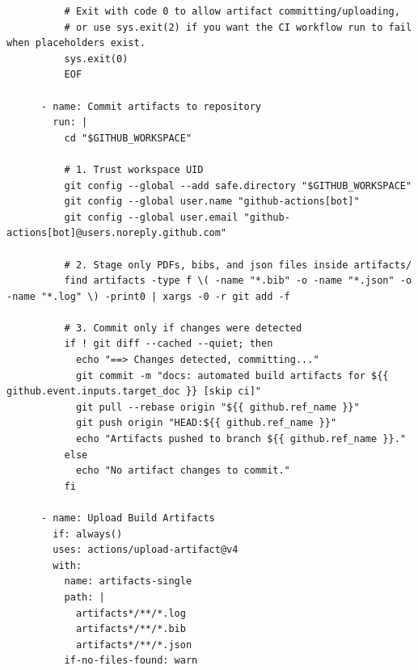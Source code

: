 \documentclass[12pt, twoside]{article}
\begin{document}
\begin{lstlisting}
          # Exit with code 0 to allow artifact committing/uploading,
          # or use sys.exit(2) if you want the CI workflow run to fail when placeholders exist.
          sys.exit(0)
          EOF

      - name: Commit artifacts to repository
        run: |
          cd "$GITHUB_WORKSPACE"

          # 1. Trust workspace UID
          git config --global --add safe.directory "$GITHUB_WORKSPACE"
          git config --global user.name "github-actions[bot]"
          git config --global user.email "github-actions[bot]@users.noreply.github.com"

          # 2. Stage only PDFs, bibs, and json files inside artifacts/
          find artifacts -type f \( -name "*.bib" -o -name "*.json" -o -name "*.log" \) -print0 | xargs -0 -r git add -f

          # 3. Commit only if changes were detected
          if ! git diff --cached --quiet; then
            echo "==> Changes detected, committing..."
            git commit -m "docs: automated build artifacts for ${{ github.event.inputs.target_doc }} [skip ci]"
            git pull --rebase origin "${{ github.ref_name }}"
            git push origin "HEAD:${{ github.ref_name }}"
            echo "Artifacts pushed to branch ${{ github.ref_name }}."
          else
            echo "No artifact changes to commit."
          fi

      - name: Upload Build Artifacts
        if: always()
        uses: actions/upload-artifact@v4
        with:
          name: artifacts-single
          path: |
            artifacts*/**/*.log
            artifacts*/**/*.bib
            artifacts*/**/*.json
          if-no-files-found: warn


\end{lstlisting}
\end{document}
